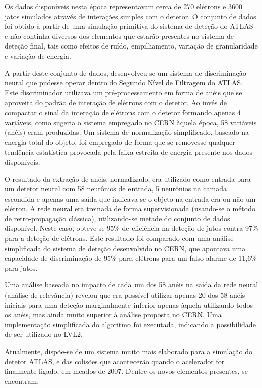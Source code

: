 Os dados disponíveis nesta época representavam cerca de 270 elétrons e 3600
jatos simulados através de interações simples com o detetor. O conjunto de
dados foi obtido à partir de uma simulação primitiva do sistema de deteção do
ATLAS e não continha diversos dos elementos que estarão presentes no sistema
de deteção final, tais como efeitos de ruído, empilhamento, variação de
granularidade e variação de energia.

A partir deste conjunto de dados, desenvolveu-se um sistema de discriminação
neural que pudesse operar dentro do Segundo Nível de Filtragem do ATLAS. Este
discriminador utilizava um pré-processamento em forma de anéis que se
aproveita do padrão de interação de elétrons com o detetor. Ao invés de
compactar o sinal da interação de elétrons com o detetor formando apenas 4
variáveis, como sugeria o sistema empregado no CERN àquela época, 58 variáveis
(anéis) eram produzidas. Um sistema de normalização simplificado, baseado na
energia total do objeto, foi empregado de forma que se removesse qualquer
tendência estatística provocada pela faixa estreita de energia presente nos
dados disponíveis.

O resultado da extração de anéis, normalizado, era utilizado como entrada para
um detetor neural com 58 neurônios de entrada, 5 neurônios na camada escondida
e apenas uma saída que indicava se o objeto na entrada era ou não um
elétron. A rede neural era treinada de forma supervisionada (usando-se o
método de retro-propagação clássica), utilizando-se metade do conjunto de
dados disponível. Neste caso, obteve-se 95\% de eficiência na deteção de jatos
contra 97\% para a deteção de elétrons. Este resultado foi comparado com uma
análise simplificada do sistema de deteção desenvolvido no CERN, que apontava
uma capacidade de discriminação de 95\% para elétrons para um falso-alarme de
11,6\% para jatos.

Uma análise baseada no impacto de cada um dos 58 anéis na saída da rede neural
(análise de relevância) revelou que era possível utilizar apenas 20 dos 58
anéis iniciais para uma deteção marginalmente inferior apenas àquela
utilizando todos os anéis, mas ainda muito superior à análise proposta no
CERN. Uma implementação simplificada do algoritmo foi executada, indicando a
possibilidade de ser utilizado no LVL2.

Atualmente, dispõe-se de um sistema muito mais elaborado para a simulação do
detetor ATLAS, e das colisões que acontecerão quando o acelerador for
finalmente ligado, em meados de 2007. Dentre os novos elementos presentes, se
encontram:

